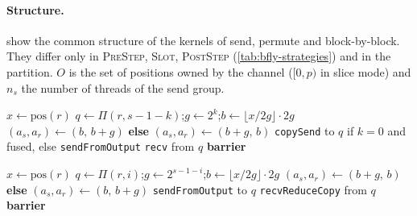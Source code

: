 \paragraph{Structure.}
 show the common structure of the kernels of send, permute and block-by-block.
They differ only in \textsc{PreStep}, \textsc{Slot}, \textsc{PostStep} (\cref{tab:bfly-strategies}) and in the partition.
$O$ is the set of positions owned by the channel ($[0,p)$ in slice mode) and $n_s$ the number of threads of the send group.

\begin{algorithm}[t]
\caption{Bine allgather, kernel of one channel.}
\label{alg:bfly-allgather}
\begin{algorithmic}[1]
\State {}
\State $x\gets\mathrm{pos}(r)$
  \State $q\gets\Pi(r,s-1-k)$;\quad $g\gets2^k$;\quad $b\gets\lfloor x/2g\rfloor\cdot2g$
   $(a_s,a_r)\gets(b,\,b+g)$ \textbf{else} $(a_s,a_r)\gets(b+g,\,b)$ \EndIf
    \For{each transfer of the slots \Call{Slot}{$y$}, $y\in[a_s,a_s+g)\cap O$}
      \State \texttt{copySend} to $q$ if $k=0$ and fused, else \texttt{sendFromOutput}
    \EndFor
  \Else{}
    \For{each transfer of the slots \Call{Slot}{$y$}, $y\in[a_r,a_r+g)\cap O$}
      \State \texttt{recv} from $q$
    \EndFor
  \EndIf
  \State \textbf{barrier}
\EndFor
\State {}
\end{algorithmic}
\end{algorithm}

\begin{algorithm}[t]
\caption{Bine reduce-scatter, kernel of one channel.}
\label{alg:bfly-reducescatter}
\begin{algorithmic}[1]
\State {}
\State $x\gets\mathrm{pos}(r)$
  \State $q\gets\Pi(r,i)$;\quad $g\gets2^{s-1-i}$;\quad $b\gets\lfloor x/2g\rfloor\cdot2g$
   $(a_s,a_r)\gets(b+g,\,b)$ \textbf{else} $(a_s,a_r)\gets(b,\,b+g)$ \EndIf
    \For{each transfer of the slots \Call{Slot}{$y$}, $y\in[a_s,a_s+g)\cap O$}
      \State \texttt{sendFromOutput} to $q$
    \EndFor
  \Else{}
    \For{each transfer of the slots \Call{Slot}{$y$}, $y\in[a_r,a_r+g)\cap O$}
      \State \texttt{recvReduceCopy} from $q$ 
    \EndFor
  \EndIf
  \State \textbf{barrier}
\EndFor
\State {}
\end{algorithmic}
\end{algorithm}

